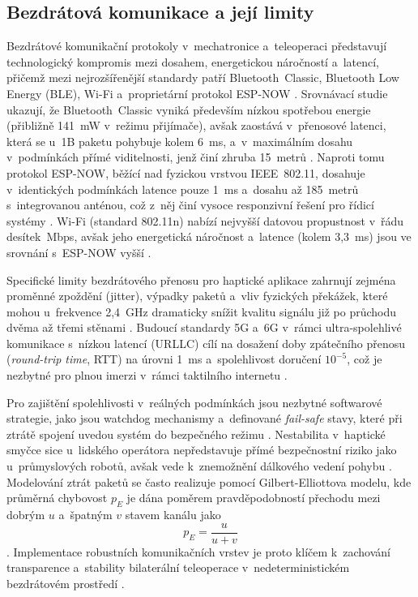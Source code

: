 \documentclass[FZS,DP]{tulthesis}
\begin{document}
\subsection{Bezdrátová komunikace a její limity}
Bezdrátové komunikační protokoly v~mechatronice a~teleoperaci představují technologický kompromis mezi dosahem, energetickou náročností a~latencí, přičemž mezi nejrozšířenější standardy patří Bluetooth~Classic, Bluetooth Low Energy (BLE), Wi-Fi a~proprietární protokol ESP-NOW \cite{Eridani2021918, Urazayev202354, Bolarinwa2022}.
Srovnávací studie ukazují, že Bluetooth~Classic vyniká především nízkou spotřebou energie (přibližně 141~mW v~režimu přijímače), avšak zaostává v~přenosové latenci, která se u~1B paketu pohybuje kolem 6~ms, a~v~maximálním dosahu v~podmínkách přímé viditelnosti, jenž činí zhruba 15~metrů \cite{Eridani2021918}.
Naproti tomu protokol ESP-NOW, běžící nad fyzickou vrstvou IEEE~802.11, dosahuje v~identických podmínkách latence pouze 1~ms a~dosahu až 185~metrů s~integrovanou anténou, což z~něj činí vysoce responzivní řešení pro řídicí systémy \cite{Eridani2021918, Urazayev202354, Papakonstantinou20251218}.
Wi-Fi (standard 802.11n) nabízí nejvyšší datovou propustnost v~řádu desítek~Mbps, avšak jeho energetická náročnost a~latence (kolem 3,3~ms) jsou ve srovnání s~ESP-NOW vyšší \cite{Eridani2021918, Urazayev202354}.

Specifické limity bezdrátového přenosu pro haptické aplikace zahrnují zejména proměnné zpoždění (jitter), výpadky paketů a~vliv fyzických překážek, které mohou u~frekvence 2,4~GHz dramaticky snížit kvalitu signálu již po průchodu dvěma až třemi stěnami \cite{Suman2025, Urazayev202354}.
Budoucí standardy 5G a~6G v~rámci ultra-spolehlivé komunikace s~nízkou latencí (URLLC) cílí na dosažení doby zpátečního přenosu (\textit{round-trip time}, RTT) na úrovni 1~ms a~spolehlivost doručení $10^{-5}$, což je nezbytné pro plnou imerzi v~rámci taktilního internetu \cite{Awais202375, Aijaz2018}.

Pro zajištění spolehlivosti v~reálných podmínkách jsou nezbytné softwarové strategie, jako jsou watchdog mechanismy a~definované \textit{fail-safe} stavy, které při ztrátě spojení uvedou systém do bezpečného režimu \cite{Bolarinwa2022, Black2025}.
Nestabilita v~haptické smyčce sice u~lidského operátora nepředstavuje přímé bezpečnostní riziko jako u~průmyslových robotů, avšak vede k~znemožnění dálkového vedení pohybu \cite{Black2025}.
Modelování ztrát paketů se často realizuje pomocí Gilbert-Elliottova modelu, kde průměrná chybovost $p_E$ je dána poměrem pravděpodobností přechodu mezi dobrým $u$ a~špatným $v$ stavem kanálu jako
%
\begin{equation}
    p_E = \frac{u}{u + v}
\end{equation}
%
\cite{Suman2025}.
Implementace robustních komunikačních vrstev je proto klíčem k~zachování transparence a~stability bilaterální teleoperace v~nedeterministickém bezdrátovém prostředí \cite{Aijaz2018, Bolarinwa2022, Patel2022, Kos2018}.
\end{document}
